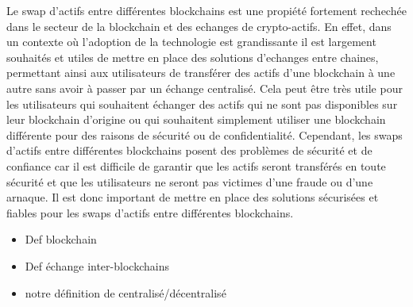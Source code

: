 Le swap d’actifs entre différentes blockchains est une propiété fortement rechechée dans le secteur de la
blockchain et des echanges de crypto-actifs. En effet, dans un contexte où l’adoption de la technologie est
grandissante \cite{evolutionCrypto2022} il est largement souhaités et utiles de mettre en place des solutions d’echanges entre chaines,
permettant ainsi aux utilisateurs de transférer des actifs d’une blockchain à une autre sans avoir à passer par
un échange centralisé. Cela peut être très utile pour les utilisateurs qui souhaitent échanger des actifs qui
ne sont pas disponibles sur leur blockchain d’origine ou qui souhaitent simplement utiliser une blockchain
différente pour des raisons de sécurité ou de confidentialité. Cependant, les swaps d’actifs entre différentes
blockchains posent des problèmes de sécurité et de confiance car il est difficile de garantir que les actifs seront
transférés en toute sécurité et que les utilisateurs ne seront pas victimes d’une fraude ou d’une arnaque. Il est
donc important de mettre en place des solutions sécurisées et fiables pour les swaps d’actifs entre différentes
blockchains.


\begin{itemize}
    \item Def blockchain
    \item Def échange inter-blockchains
    \item notre définition de  centralisé/décentralisé
\end{itemize}
